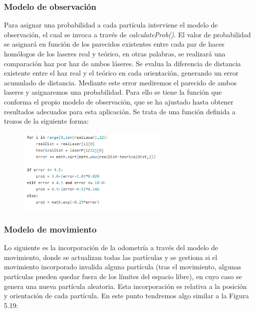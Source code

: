 \subsubsection{Modelo de observación}
Para asignar una probabilidad a cada partícula interviene el modelo de observación, el cual se invoca a través de \textit{calculateProb()}. El valor de probabilidad se asignará en función de los parecidos existentes entre cada par de haces homólogos de los laseres real y teórico, en otras palabras, se realizará una comparación haz por haz de ambos láseres. Se evalua la diferencia de distancia existente entre el haz real y el teórico en cada orientación, generando un error acumulado de distancia. Mediante este error mediremos el parecido de ambos laseres y asignaremos una probabilidad. Para ello se tiene la función que conforma el propio modelo de observación, que se ha ajustado hasta obtener resultados adecuados para esta aplicación. Se trata de una función definida a trozos de la siguiente forma:

\begin{figure}[H]
\begin{center}
	\includegraphics[width=0.65\textwidth]{figures/codemodeloobservacion.png}
	\label{fig.codemodeloobservacion}
	\end{center}
\end{figure}   

\subsubsection{Modelo de movimiento}
Lo siguiente es la incorporación de la odometría a través del modelo de movimiento, donde se actualizan todas las partículas y se gestiona si el movimiento incorporado invalida alguna partícula (tras el movimiento, algunas partículas pueden quedar fuera de los límites del espacio libre), en cuyo caso se genera una nueva partícula aleatoria. Esta incorporación es relativa a la posición y orientación de cada partícula. En este punto tendremos algo similar a la Figura 5.19:

